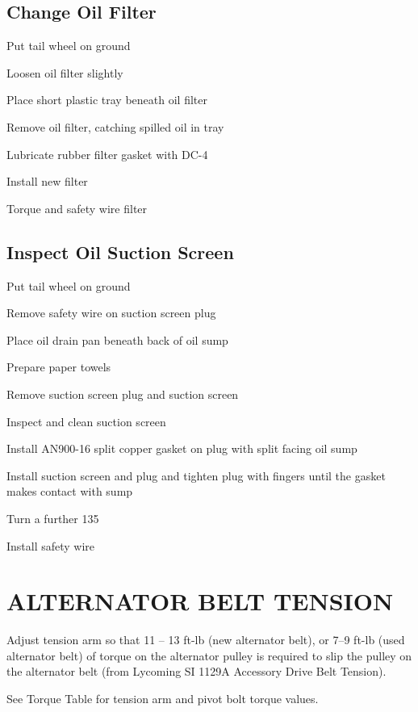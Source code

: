 \subsection{Change Oil Filter}
\begin{enumerate*}
    \item Put tail wheel on ground
    \item Loosen oil filter slightly
    \item Place short plastic tray beneath oil filter
    \item Remove oil filter, catching spilled oil in tray
    \item Lubricate rubber filter gasket with DC-4
    \item Install new filter
    \item Torque and safety wire filter
\end{enumerate*}

\subsection{Inspect Oil Suction Screen}
\begin{enumerate*}
    \item Put tail wheel on ground
    \item Remove safety wire on suction screen plug
    \item Place oil drain pan beneath back of oil sump
    \item Prepare paper towels
    \item Remove suction screen plug and suction screen
    \item Inspect and clean suction screen
    \item Install AN900-16 split copper gasket on plug with split facing oil sump
    \item Install suction screen and plug and tighten plug with fingers until the gasket makes contact with sump
    \item Turn a further 135 \textdegree
    \item Install safety wire
\end{enumerate*}
    



\section{ALTERNATOR BELT TENSION} 
\begin{enumerate*}
	\item Adjust tension arm so that 11 -- 13 ft-lb (new alternator belt), or 7--9 ft-lb (used alternator belt) of torque on the alternator pulley is required to slip the pulley on the alternator belt (from Lycoming SI 1129A Accessory Drive Belt Tension). 
	\item See Torque Table for tension arm and pivot bolt torque values. 
\end{enumerate*}

